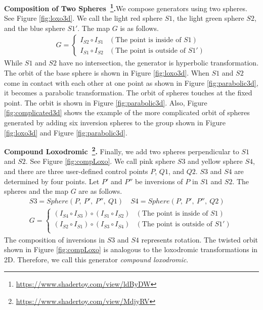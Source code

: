 \noindent\textbf{Composition of Two Spheres~\footnote{\url{https://www.shadertoy.com/view/ldByDW}}.}We compose generators using two spheres.
See Figure \ref{fig:loxo3d}.
We call the light red sphere $S1$, the light green sphere $S2$, and the blue
sphere $S1'$.
The map $G$ is as follows.
\begin{align*}
G =
\begin{cases}
 I_{S2} \circ I_{S1} & (\text{The point is inside of } S1) \\
 I_{S1} \circ I_{S2} & (\text{The point is outside of }S1')
\end{cases}
\end{align*}
While $S1$ and $S2$ have no intersection, the generator is hyperbolic
transformation.
The orbit of the base sphere is shown in Figure \ref{fig:loxo3d}.
When $S1$ and $S2$ come in contact with each other at one point as shown
in Figure \ref{fig:parabolic3d}, it becomes a
parabolic transformation.
The orbit of spheres touches at the fixed point.
The orbit is shown in Figure \ref{fig:parabolic3d}.
Also, Figure \ref{fig:complicated3d} shows the example of the more
complicated orbit of spheres generated by adding six inversion spheres to
the group shown in Figure \ref{fig:loxo3d} and Figure \ref{fig:parabolic3d}.

\noindent\textbf{Compound
Loxodromic~\footnote{\url{https://www.shadertoy.com/view/MdjyRV}}.}
Finally, we add two spheres perpendicular to $S1$ and $S2$.
See Figure \ref{fig:compLoxo}.
We call pink sphere $S3$ and yellow sphere $S4$, and there are three
user-defined control points $P$, $Q1$, and $Q2$.
$S3$ and $S4$ are determined by four points.
Let $P'$ and $P''$ be inversions of $P$ in $S1$ and $S2$.
The spheres and the map $G$ are as follows.
\begin{align*}
S3 = Sphere(P,~P',~P'',~Q1) \quad
S4 = Sphere(P,~P',~P'',~Q2) \\
G =
\begin{cases}
 (I_{S4} \circ I_{S3}) \circ (I_{S1} \circ I_{S2}) & (\text{The point is inside of } S1) \\
 (I_{S2} \circ I_{S1}) \circ (I_{S3} \circ I_{S4}) & (\text{The point is outside of }S1')\\
\end{cases}
\end{align*}
The composition of inversions in $S3$ and $S4$ represents rotation.
The twisted orbit shown in Figure
\ref{fig:compLoxo} is analogous to the loxodromic
transformations in 2D.
Therefore, we call this generator \textit{compound loxodromic}.


